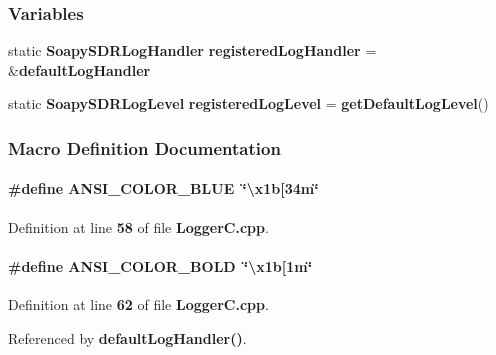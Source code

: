 \subsubsection*{Variables}
\begin{DoxyCompactItemize}
\item 
static {\bf Soapy\+S\+D\+R\+Log\+Handler} {\bf registered\+Log\+Handler} = \&{\bf default\+Log\+Handler}
\item 
static {\bf Soapy\+S\+D\+R\+Log\+Level} {\bf registered\+Log\+Level} = {\bf get\+Default\+Log\+Level}()
\end{DoxyCompactItemize}


\subsubsection{Macro Definition Documentation}
\paragraph[{A\+N\+S\+I\+\_\+\+C\+O\+L\+O\+R\+\_\+\+B\+L\+UE}]{\setlength{\rightskip}{0pt plus 5cm}\#define A\+N\+S\+I\+\_\+\+C\+O\+L\+O\+R\+\_\+\+B\+L\+UE~\char`\"{}\textbackslash{}x1b[34m\char`\"{}}\label{LoggerC_8cpp_aca16e6a49eb51333c5fd3eee19487315}


Definition at line {\bf 58} of file {\bf Logger\+C.\+cpp}.

\paragraph[{A\+N\+S\+I\+\_\+\+C\+O\+L\+O\+R\+\_\+\+B\+O\+LD}]{\setlength{\rightskip}{0pt plus 5cm}\#define A\+N\+S\+I\+\_\+\+C\+O\+L\+O\+R\+\_\+\+B\+O\+LD~\char`\"{}\textbackslash{}x1b[1m\char`\"{}}\label{LoggerC_8cpp_a192df37d7dfa835971480d2a1ca01d14}


Definition at line {\bf 62} of file {\bf Logger\+C.\+cpp}.



Referenced by {\bf default\+Log\+Handler()}.


